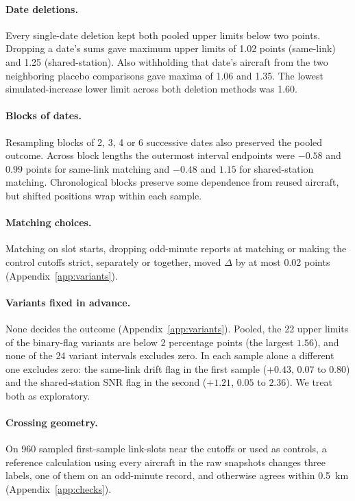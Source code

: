 \documentclass[11pt]{article}
\begin{document}
\paragraph{Date deletions.} Every single-date deletion kept both pooled upper limits below two points. Dropping a date's sums gave maximum upper limits of 1.02 points (same-link) and 1.25 (shared-station). Also withholding that date's aircraft from the two neighboring placebo comparisons gave maxima of 1.06 and 1.35. The lowest simulated-increase lower limit across both deletion methods was 1.60.

\paragraph{Blocks of dates.} Resampling blocks of 2, 3, 4 or 6 successive dates also preserved the pooled outcome. Across block lengths the outermost interval endpoints were $-0.58$ and $0.99$ points for same-link matching and $-0.48$ and $1.15$ for shared-station matching. Chronological blocks preserve some dependence from reused aircraft, but shifted positions wrap within each sample.

\paragraph{Matching choices.} Matching on slot starts, dropping odd-minute reports at matching or making the control cutoffs strict, separately or together, moved $\Delta$ by at most 0.02 points (Appendix~\ref{app:variants}).

\paragraph{Variants fixed in advance.} None decides the outcome (Appendix~\ref{app:variants}). Pooled, the 22 upper limits of the binary-flag variants are below 2 percentage points (the largest $1.56$), and none of the 24 variant intervals excludes zero. In each sample alone a different one excludes zero: the same-link drift flag in the first sample ($+0.43$, $0.07$ to $0.80$) and the shared-station SNR flag in the second ($+1.21$, $0.05$ to $2.36$). We treat both as exploratory.

\paragraph{Crossing geometry.} On 960 sampled first-sample link-slots near the cutoffs or used as controls, a reference calculation using every aircraft in the raw snapshots changes three labels, one of them on an odd-minute record, and otherwise agrees within 0.5~km (Appendix~\ref{app:checks}).
\end{document}
